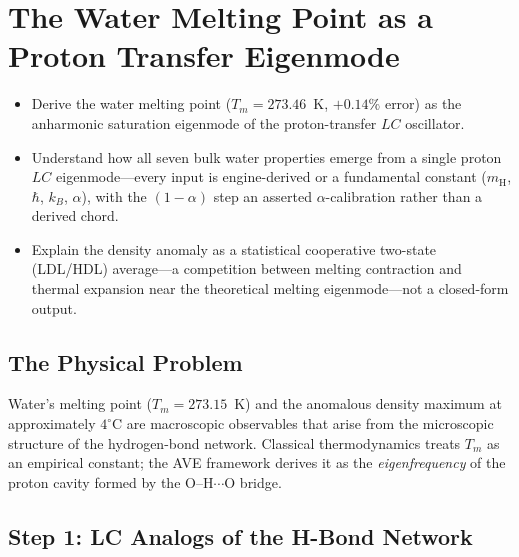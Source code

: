 \section{The Water Melting Point as a Proton Transfer Eigenmode}
\label{sec:melting_eigenmode}


\begin{objectivebox}
\begin{itemize}
    \item Derive the water melting point ($T_m = 273.46$~K, $+0.14\%$ error) as the anharmonic saturation eigenmode of the proton-transfer $LC$ oscillator.
    \item Understand how all seven bulk water properties emerge from a single proton $LC$ eigenmode---every input is engine-derived or a fundamental constant ($m_\text{H}$, $\hbar$, $k_B$, $\alpha$), with the $(1-\alpha)$ step an asserted $\alpha$-calibration rather than a derived chord.
    \item Explain the density anomaly as a statistical cooperative two-state (LDL/HDL) average---a competition between melting contraction and thermal expansion near the theoretical melting eigenmode---not a closed-form output.
\end{itemize}
\end{objectivebox}

\subsection{The Physical Problem}

Water's melting point ($T_m = 273.15$~K) and the anomalous density maximum 
at approximately $4^{\circ}$C are macroscopic observables that arise from the 
microscopic structure of the hydrogen-bond network. Classical thermodynamics 
treats $T_m$ as an empirical constant; the AVE framework derives it as the 
\emph{eigenfrequency} of the proton cavity formed by the O--H$\cdots$O bridge.

\subsection{Step 1: LC Analogs of the H-Bond Network}

